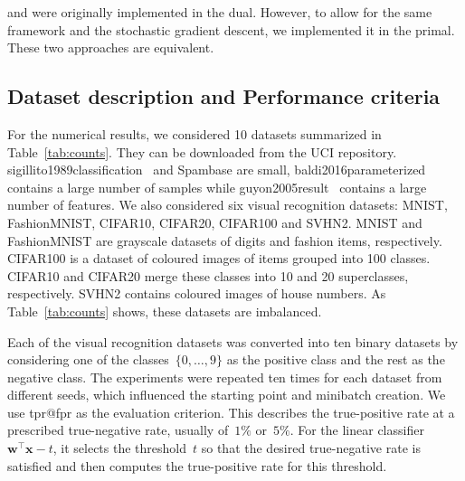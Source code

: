 \TopPush and \tauFPL were originally implemented in the dual. However, to allow for the same framework and the stochastic gradient descent, we implemented it in the primal. These two approaches are equivalent.

\subsection{Dataset description and Performance criteria}\label{sec:datasets}

For the numerical results, we considered 10 datasets summarized in Table~\ref{tab:counts}. They can be downloaded from the UCI repository. sigillito1989classification~\cite{sigillito1989classification} and Spambase are small, baldi2016parameterized~\cite{baldi2016parameterized} contains a large number of samples while guyon2005result~\cite{guyon2005result} contains a large number of features. We also considered six visual recognition datasets: MNIST, FashionMNIST, CIFAR10, CIFAR20, CIFAR100 and SVHN2. MNIST and FashionMNIST are grayscale datasets of digits and fashion items, respectively. CIFAR100 is a dataset of coloured images of items grouped into 100 classes. CIFAR10 and CIFAR20 merge these classes into 10 and 20 superclasses, respectively. SVHN2 contains coloured images of house numbers. As Table~\ref{tab:counts} shows, these datasets are imbalanced.

Each of the visual recognition datasets was converted into ten binary datasets by considering one of the classes~$\{0,\dots,9\}$ as the positive class and the rest as the negative class. The experiments were repeated ten times for each dataset from different seeds, which influenced the starting point and minibatch creation. We use tpr@fpr as the evaluation criterion. This describes the true-positive rate at a prescribed true-negative rate, usually of~$1\%$ or~$5\%$. For the linear classifier~$\bm{w}^{\top} \bm{x} - t$, it selects the threshold~$t$ so that the desired true-negative rate is satisfied and then computes the true-positive rate for this threshold.

